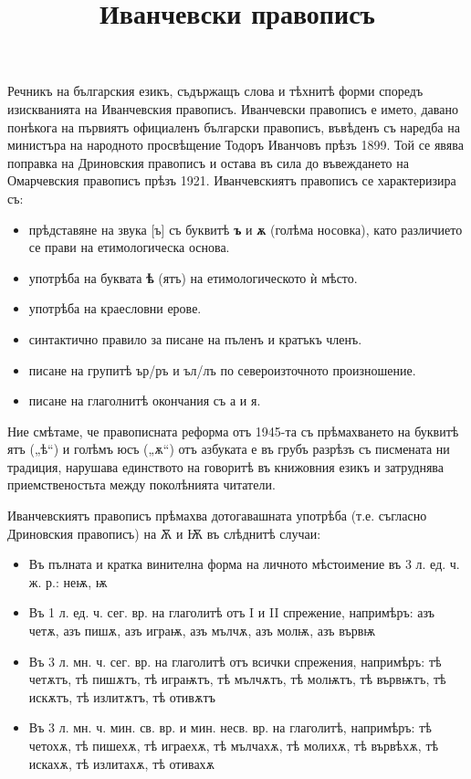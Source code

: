 \documentclass{article}
\begin{document}
	\title{Иванчевски правописъ}
\maketitle

Речникъ на българския езикъ, съдържащъ слова и тѣхнитѣ форми споредъ изискванията на Иванчевския правописъ. 
Иванчевски правописъ е името, давано понѣкога на първиятъ официаленъ български правописъ, 
въвѣденъ съ наредба на министъра на народното просвѣщение Тодоръ Иванчовъ прѣзъ 1899.
Той се явява поправка на Дриновския правописъ и остава въ сила до въвеждането на Омарчевския правописъ прѣзъ 1921. 
Иванчевскиятъ правописъ се характеризира съ:
%
\begin{itemize}
	\item прѣдставяне на звука [ъ] съ буквитѣ \textbf{ъ} и \textbf{ѫ} (голѣма носовка), като различието се прави на етимологическа основа.
	\item употрѣба на буквата \textbf{ѣ} (ятъ) на етимологическото ѝ мѣсто.
	\item употрѣба на краесловни ерове.
	\item синтактично правило за писане на пъленъ и кратъкъ членъ.
	\item писане на групитѣ ър/ръ и ъл/лъ по североизточното произношение.
	\item писане на глаголнитѣ окончания съ а и я.
\end{itemize}


Ние смѣтаме, че правописната реформа отъ 1945-та съ прѣмахването на буквитѣ ятъ („ѣ“) и голѣмъ юсъ („ѫ“) отъ азбуката е въ грубъ разрѣзъ съ писмената ни традиция, нарушава единството на говоритѣ въ книжовния езикъ и затруднява приемственостьта между поколѣнията читатели.

Иванчевскиятъ правописъ прѣмахва дотогавашната употрѣба (т.е. съгласно Дриновския правописъ) на Ѫ и Ѭ въ слѣднитѣ случаи:

\begin{itemize}
	\item Въ пълната и кратка винителна форма на личното мѣстоимение въ 3 л. ед. ч. ж. р.: неѭ, ѭ
	
	\item Въ 1 л. ед. ч. сег. вр. на глаголитѣ отъ I и II спрежение, напримѣръ: азъ четѫ, азъ пишѫ, азъ играѭ, азъ мълчѫ, азъ молѭ, азъ вървѭ
	
	\item Въ 3 л. мн. ч. сег. вр. на глаголитѣ отъ всички спрежения, напримѣръ: тѣ четѫтъ, тѣ пишѫтъ, тѣ играѭтъ, тѣ мълчѫтъ, тѣ молѭтъ, тѣ вървѭтъ, тѣ искѫтъ, тѣ излитѫтъ, тѣ отивѫтъ
	
	\item Въ 3 л. мн. ч. мин. св. вр. и мин. несв. вр. на глаголитѣ, напримѣръ: тѣ четохѫ, тѣ пишехѫ, тѣ играехѫ, тѣ мълчахѫ, тѣ молихѫ, тѣ вървѣхѫ, тѣ искахѫ, тѣ излитахѫ, тѣ отивахѫ
\end{itemize}

 
\end{document}
